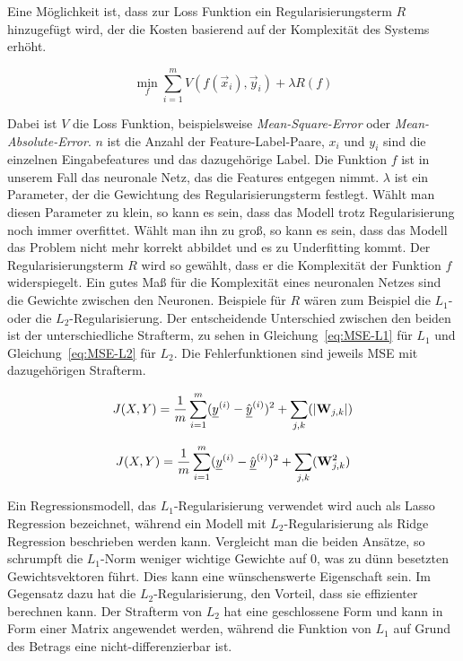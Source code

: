 Eine Möglichkeit ist, dass zur Loss Funktion ein Regularisierungsterm \(R\) hinzugefügt wird, 
der die Kosten basierend auf der Komplexität des Systems erhöht.

\begin{equation}
	\min_f \sum\limits_{i=1}^{m} V(f(\vec{x}_i), \vec{y}_i) + \lambda R(f)
\end{equation} 

Dabei ist \(V\) die Loss Funktion, beispielsweise \textit{Mean-Square-Error} oder \textit{Mean-Absolute-Error}.
\(n\) ist die Anzahl der Feature-Label-Paare,
\(x_i\) und \(y_i\) sind die einzelnen Eingabefeatures und das dazugehörige Label.
Die Funktion \(f\) ist in unserem Fall das neuronale Netz, das die Features entgegen nimmt.
\(\lambda\) ist ein Parameter, der die Gewichtung des Regularisierungsterm festlegt.
Wählt man diesen Parameter zu klein, so kann es sein, dass das Modell trotz Regularisierung noch immer overfittet.
Wählt man ihn zu groß, so kann es sein, dass das Modell das Problem nicht mehr korrekt abbildet und es zu Underfitting kommt.
Der Regularisierungsterm \(R\) wird so gewählt, dass er die Komplexität der Funktion \(f\) widerspiegelt.
Ein gutes Maß für die Komplexität eines neuronalen Netzes sind die Gewichte zwischen den Neuronen.
Beispiele für \(R\) wären zum Beispiel die \(L_1\)- oder die \(L_2\)-Regularisierung. %
Der entscheidende Unterschied zwischen den beiden ist der unterschiedliche Strafterm, zu sehen in Gleichung~\eqref{eq:MSE-L1} für \(L_1\) und Gleichung~\eqref{eq:MSE-L2} für \(L_2\). 
Die Fehlerfunktionen sind jeweils MSE mit dazugehörigen Strafterm.

\begin{equation} \label{eq:MSE-L1}
	J(X, Y) = \frac{1}{m} \sum_{i=1}^{m} ({\underline{y}}^{(i)} - \hat{{\underline{y}}}^{(i)})^2 + \sum_{j, k} (|{{\mathbf{W}}}_{j,k}|)
\end{equation} 

\begin{equation} \label{eq:MSE-L2}
	J(X, Y) = \frac{1}{m} \sum_{i=1}^{m} ({\underline{y}}^{(i)} - \hat{{\underline{y}}}^{(i)})^2 + \sum_{j, k} ({{\mathbf{W}}}_{j,k}^2)
\end{equation} 


Ein Regressionsmodell, das \(L_1\)-Regularisierung verwendet wird auch als Lasso Regression bezeichnet, 
während ein Modell mit \(L_2\)-Regularisierung als Ridge Regression beschrieben werden kann.
Vergleicht man die beiden Ansätze, so schrumpft die \(L_1\)-Norm weniger wichtige Gewichte auf 0, was zu dünn besetzten Gewichtsvektoren führt.
Dies kann eine wünschenswerte Eigenschaft sein.
Im Gegensatz dazu hat die \(L_2\)-Regularisierung, den Vorteil, dass sie effizienter berechnen kann.
Der Strafterm von \(L_2\) hat eine geschlossene Form und kann in Form einer Matrix angewendet werden, während die Funktion von \(L_1\) auf Grund des Betrags eine nicht-differenzierbar ist.


